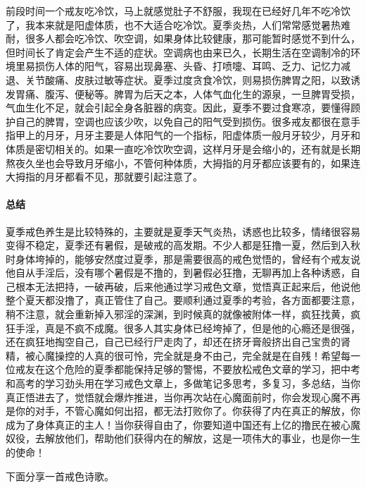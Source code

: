 前段时间一个戒友吃冷饮，马上就感觉肚子不舒服，我现在已经好几年不吃冷饮了，我本来就是阳虚体质，也不大适合吃冷饮。夏季炎热，人们常常感觉暑热难耐，很多人都会吃冷饮、吹空调，如果身体比较健康，那可能暂时感觉不到什么，但时间长了肯定会产生不适的症状。空调病也由来已久，长期生活在空调制冷的环境里易损伤人体的阳气，容易出现鼻塞、头昏、打喷嚏、耳鸣、乏力、记忆力减退、关节酸痛、皮肤过敏等症状。夏季过度贪食冷饮，则易损伤脾胃之阳，以致诱发胃痛、腹泻、便秘等。脾胃为后天之本，人体气血化生的源泉，一旦脾胃受损，气血生化不足，就会引起全身各脏器的病变。因此，夏季不要过食寒凉，要懂得顾护自己的脾胃，空调也应该少吹，以免自己的阳气受到损伤。很多戒友都很在意手指甲上的月牙，月牙主要是人体阳气的一个指标，阳虚体质一般月牙较少，月牙和体质是密切相关的。如果一直吃冷饮吹空调，这样月牙是会缩小的，还有就是长期熬夜久坐也会导致月牙缩小，不管何种体质，大拇指的月牙都应该要有的，如果连大拇指的月牙都看不见，那就要引起注意了。

\paragraph*{总结}

夏季戒色养生是比较特殊的，主要就是夏季天气炎热，诱惑也比较多，情绪很容易变得不稳定，夏季还有暑假，是破戒的高发期。不少人都是狂撸一夏，然后到入秋时身体垮掉的，能够安然度过夏季，那是需要很高的戒色觉悟的，曾经有个戒友说他自从手淫后，没有哪个暑假是不撸的，到暑假必狂撸，无聊再加上各种诱惑，自己根本无法把持，一破再破，后来他通过学习戒色文章，觉悟真正起来后，他说他整个夏天都没撸了，真正管住了自己。要顺利通过夏季的考验，各方面都要注意，稍不注意，就会重新掉入邪淫的深渊，到时候真的就像被附体一样，疯狂找黄，疯狂手淫，真是不疯不成魔。很多人其实身体已经垮掉了，但是他的心瘾还是很强，还在疯狂地掏空自己，自己已经行尸走肉了，却还在挤牙膏般挤出自己宝贵的肾精，被心魔操控的人真的很可怜，完全就是身不由己，完全就是在自残！希望每一位戒友在这个危险的夏季都能保持足够的警惕，不要放松戒色文章的学习，把中考和高考的学习劲头用在学习戒色文章上，多做笔记多思考，多复习，多总结，当你真正悟进去了，觉悟就会爆炸推进，当你再次站在心魔面前时，你会发现心魔不再是你的对手，不管心魔如何出招，都无法打败你了。你获得了内在真正的解放，你成为了身体真正的主人！当你获得自由了，你要知道中国还有上亿的撸民在被心魔奴役，去解放他们，帮助他们获得内在的解放，这是一项伟大的事业，也是你一生的使命！

下面分享一首戒色诗歌。

